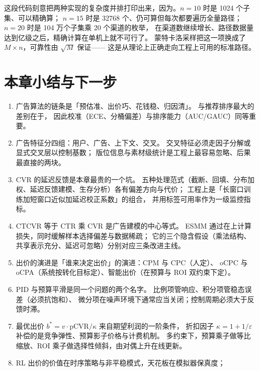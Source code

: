这段代码刻意把两种实现的复杂度并排打印出来，因为。$n = 10$ 时是 1024 个子集、可以精确算；
$n = 15$ 时是 32768 个、仍可算但每次都要遍历全量路径；
$n = 20$ 时是 104 万个子集乘 20 个渠道的枚举，
在渠道数继续增长、路径数据量达到亿级之后，精确计算在单机上就不可行了。
蒙特卡洛采样把这一项换成了 $M \times n$，可靠性由 $\sqrt{M}$ 保证——
这是从理论上正确走向工程上可用的标准路径。

\section{本章小结与下一步}

\begin{keypoint}[本章要点回顾]
\begin{enumerate}
  \item 广告算法的链条是「预估准、出价巧、花钱稳、归因清」。
        与推荐排序最大的差别在于，
        因此校准（ECE、分桶偏差）与排序能力（AUC/GAUC）同等重要。
  \item 广告特征分四组：用户、广告、上下文、交叉。
        交叉特征必须走因子分解或显式交叉层以控制基数；
        版位信息与素材级统计是工程上最容易忽略、后果最直接的两块。
  \item CVR 的延迟反馈是本章最贵的一个坑。
        五种处理范式（截断、回填、分布加权、延迟反馈建模、生存分析）各有偏差方向与代价；
        工程上是「长窗口训练加短窗口近似加延迟校正系数」的组合，
        并用标签可用率作为一级监控指标。
  \item CTCVR 等于 CTR 乘 CVR 是广告建模的中心等式。
        ESMM 通过在上计算损失，同时缓解样本选择偏差与数据稀疏；
        它的三个隐含假设（乘法结构、共享表示充分、延迟可忽略）分别对应三条改进主线。
  \item 出价的演进是「谁来决定出价」的演进：CPM 与 CPC（人定）、
        oCPC 与 oCPA（系统按转化目标定）、智能出价（在预算与 ROI 双约束下定）。
  \item PID 与预算平滑是同一个问题的两个名字。
        比例项管响应、积分项管稳态误差（必须抗饱和）、
        微分项在噪声环境下通常应当关闭；控制周期必须大于反馈时滞。
  \item 最优出价 $b^{*} = v \cdot \mathrm{pCVR} / \kappa$ 来自期望利润的一阶条件，
        折扣因子 $\kappa = 1 + 1/\varepsilon$ 补偿的是竞争弹性、预算影子价格与计费机制。
        多约束下，预算乘子做等比缩放、ROI 乘子做选择性倾斜，由对偶上升在线更新。
  \item RL 出价的价值在时序策略与非平稳模式，天花板在模拟器保真度；

\end{enumerate}
\end{keypoint}
